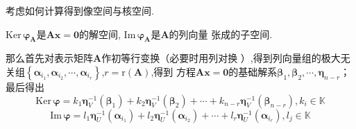 考虑如何计算得到像空间与核空间.
\begin{red}
\begin{remark}
    $\mathrm{Ker}\,\bm{\varphi}_{\bm{A}}$是$\bm{Ax}=\bm{0}$的解空间,
    $\mathrm{Im}\,\bm{\varphi}_{\bm{A}}$是$\bm{A}$的列向量
    张成的子空间.
\end{remark}
\end{red}
那么首先对表示矩阵$\bm{A}$作初等行变换（必要时用列对换
）,得到列向量组的极大无关组$\left\{
    \bm{\alpha}_{i_1},\bm{\alpha}_{i_2},\cdots,\bm{\alpha}_{i_r}
\right\}$,$r=\mathrm{r}\left(\bm{A}\right)$,得到
方程$\bm{Ax}=\bm{0}$的基础解系$\bm{\beta}_1,\bm{\beta}_2,\cdots,\bm{\eta}_{n-r}$；
最后得出
\[
\mathrm{Ker}\,\bm{\varphi}=k_1\bm{\eta}_V^{-1}\left(\bm{\beta}_1\right)+
k_2\bm{\eta}_V^{-1}\left(\bm{\beta}_2\right)+\cdots+
k_{n-r}\bm{\eta}_V^{-1}\left(\bm{\beta}_{n-r}\right),k_i \in \mathbb{K}
\]
\[
\mathrm{Im}\,\bm{\varphi}=l_1\bm{\eta}_U^{-1}\left(\bm{\alpha}_{i_1}\right)+
l_2\bm{\eta}_U^{-1}\left(\bm{\alpha}_{i_2}\right)
+\cdots+
l_r\bm{\eta}_U^{-1}\left(\bm{\alpha}_{i_r}\right),l_j \in \mathbb{K}
\]
